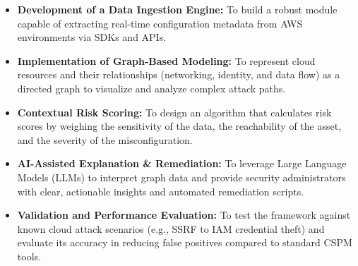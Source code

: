 \begin{itemize}
\tightlist
\item
  \textbf{Development of a Data Ingestion Engine:} To build a robust module capable of extracting real-time configuration metadata from AWS environments via SDKs and APIs.\\
\item
  \textbf{Implementation of Graph-Based Modeling:} To represent cloud resources and their relationships (networking, identity, and data flow) as a directed graph to visualize and analyze complex attack paths.\\
\item
  \textbf{Contextual Risk Scoring:} To design an algorithm that calculates risk scores by weighing the sensitivity of the data, the reachability of the asset, and the severity of the misconfiguration.\\
\item
  \textbf{AI-Assisted Explanation \& Remediation:} To leverage Large Language Models (LLMs) to interpret graph data and provide security administrators with clear, actionable insights and automated remediation scripts.\\
\item
  \textbf{Validation and Performance Evaluation:} To test the framework against known cloud attack scenarios (e.g., SSRF to IAM credential theft) and evaluate its accuracy in reducing false positives compared to standard CSPM tools.
\end{itemize}
